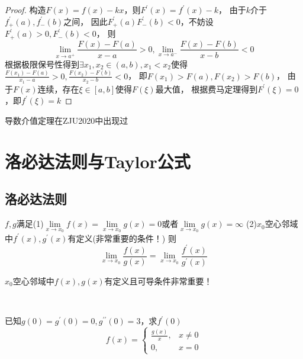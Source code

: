 \begin{proof}
  构造$F(x) = f(x) - kx$，则$F^{\prime}(x) = f^{\prime}(x) - k$，
  由于$k$介于$f_+^{\prime}(a), f_-^{\prime}(b)$之间，
  因此$F^{\prime}_+(a)F^{\prime}_-(b) < 0$，不妨设$F_+^{\prime}(a) > 0, F_-^{\prime}(b) < 0$，
  则
  \begin{equation*}
    \lim \limits _{x \rightarrow a^+} \frac{F(x) - F(a)}{x - a} > 0, \lim \limits _{x \rightarrow a^-} \frac{F(x) - F(b)}{x - b} < 0
  \end{equation*}
  根据极限保号性得到$\exists x_1,x_2 \in (a,b), x_1 < x_2$使得$\frac{F(x_1) - F(a)}{x_1 - a} > 0, \frac{F(x_2) - F(b)}{x_2 - b} < 0$，
  即$F(x_1) > F(a), F(x_2) > F(b)$，
  由于$F(x)$连续，存在$\xi \in [a,b]$使得$F(\xi)$最大值，
  根据费马定理得到$F^{\prime}(\xi) = 0$，即$f^{\prime}(\xi) = k$
\end{proof}

\begin{note}
  导数介值定理在ZJU2020中出现过
\end{note}

\section{洛必达法则与Taylor公式}

\subsection{洛必达法则}

\begin{theorem}[洛必达法则]
  $f,g$满足(1)$\lim \limits _{x \rightarrow x_0} f(x) = \lim \limits _{x \rightarrow x_0}g(x) = 0$或者$\lim \limits _{x \rightarrow x_0}g(x) = \infty$
  (2)$x_0$空心邻域中$f^{\prime}(x),g^{\prime}(x)$有定义(非常重要的条件！)
  则
  \begin{equation*}
    \lim \limits _{x \rightarrow x_0}\frac{f(x)}{g(x)} = \lim \limits _{x \rightarrow x_0} \frac{f^{\prime}(x)}{g^{\prime}(x)}
  \end{equation*}
\end{theorem}

\begin{note}
  $x_0$空心邻域中$f(x),g(x)$有定义且可导条件非常重要！
\end{note}

~

\begin{exercise}[空心邻域中没定义则只能用定义]
  已知$g(0) = g^{\prime}(0) = 0, g^{\prime\prime}(0) = 3$，求$f^{\prime}(0)$
  \begin{equation*}
    f(x) =
    \begin{cases}
      \frac{g(x)}{x}, & x\neq 0\\
      0, & x = 0
    \end{cases}
  \end{equation*}
\end{exercise}

